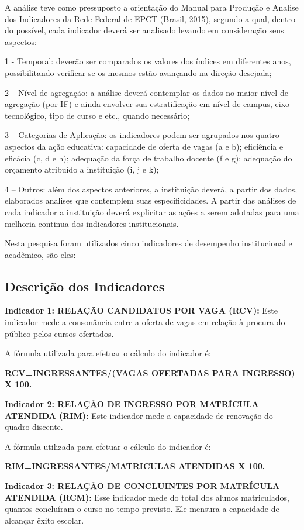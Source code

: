 \documentclass[article,12pt,onesidea,4paper,english,brazil]{abntex2}
\begin{document}
	A análise teve como pressuposto a orientação do Manual para Produção e Analise dos
	Indicadores da Rede Federal de EPCT (Brasil, 2015), segundo a qual, dentro do possível, cada
	indicador deverá ser analisado levando em consideração seus aspectos:
	
	1 - Temporal: deverão ser comparados os valores dos índices em diferentes anos, possibilitando
	verificar se os mesmos estão avançando na direção desejada;
	
	2 – Nível de agregação: a análise deverá contemplar os dados no maior nível de agregação (por
	IF) e ainda envolver sua estratificação em nível de campus, eixo tecnológico, tipo de curso e etc.,
	quando necessário;
	
	3 – Categorias de Aplicação: os indicadores podem ser agrupados nos quatro aspectos da ação
	educativa: capacidade de oferta de vagas (a e b); eficiência e eficácia (c, d e h); adequação da
	força de trabalho docente (f e g); adequação do orçamento atribuído a instituição (i, j e k);
	
	4 – Outros: além dos aspectos anteriores, a instituição deverá, a partir dos dados, elaborados
	analises que contemplem suas especificidades. A partir das análises de cada indicador a
	instituição deverá explicitar as ações a serem adotadas para uma melhoria continua dos
	indicadores institucionais.
	
	Nesta pesquisa foram utilizados cinco indicadores de desempenho institucional e acadêmico,
	são eles:
	
	\subsection*{Descrição dos Indicadores}
	\textbf{Indicador 1: RELAÇÃO CANDIDATOS POR VAGA (RCV):} Este indicador mede a
	consonância entre a oferta de vagas em relação à procura do público pelos cursos ofertados.
	
	A fórmula utilizada para efetuar o cálculo do indicador é:
	
	\textbf{RCV=INGRESSANTES/(VAGAS OFERTADAS PARA INGRESSO) X 100.}
	
	\textbf{Indicador 2: RELAÇÃO DE INGRESSO POR MATRÍCULA ATENDIDA (RIM):} Este
	indicador mede a capacidade de renovação do quadro discente.
	
	A fórmula utilizada para efetuar o cálculo do indicador é:
	
    \textbf{	RIM=INGRESSANTES/MATRICULAS ATENDIDAS X 100.}
	
	\textbf{Indicador 3: RELAÇÃO DE CONCLUINTES POR MATRÍCULA ATENDIDA (RCM):}
	Esse indicador mede do total dos alunos matriculados, quantos concluíram o curso no tempo
	previsto. Ele mensura a capacidade de alcançar êxito escolar.
	
\end{document}

